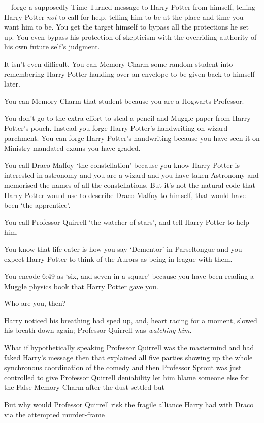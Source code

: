 —forge a supposedly Time-Turned message to Harry Potter from himself, telling
Harry Potter \emph{not} to call for help, telling him to be at the place and
time you want him to be. You get the target himself to bypass all the
protections he set up. You even bypass his protection of skepticism with the
overriding authority of his own future self's judgment.

It isn't even difficult. You can Memory-Charm some random student into
remembering Harry Potter handing over an envelope to be given back to himself
later.

You can Memory-Charm that student because you are a Hogwarts Professor.

You don't go to the extra effort to steal a pencil and Muggle paper from Harry
Potter's pouch. Instead you forge Harry Potter's handwriting on wizard
parchment. You can forge Harry Potter's handwriting because you have seen it on
Ministry-mandated exams you have graded.

You call Draco Malfoy `the constellation' because you know Harry Potter is
interested in astronomy and you are a wizard and you have taken Astronomy and
memorised the names of all the constellations. But it's not the natural code
that Harry Potter would use to describe Draco Malfoy to himself, that would
have been `the apprentice'.

You call Professor Quirrell `the watcher of stars', and tell Harry Potter to
help him.

You know that life-eater is how you say `Dementor' in Parseltongue and you
expect Harry Potter to think of the Aurors as being in league with them.

You encode 6:49 as `six, and seven in a square' because you have been reading a
Muggle physics book that Harry Potter gave you.

Who are you, then?

Harry noticed his breathing had sped up, and, heart racing for a moment,
slowed his breath down again; Professor Quirrell was \emph{watching him}.

What if hypothetically speaking Professor Quirrell was the mastermind and had
faked Harry's message then that explained all five parties showing up the whole
synchronous coordination of the comedy and then Professor Sprout was just
controlled to give Professor Quirrell deniability let him blame someone else
for the False Memory Charm after the dust settled but

But why would Professor Quirrell risk the fragile alliance Harry had with Draco
via the attempted murder-frame

